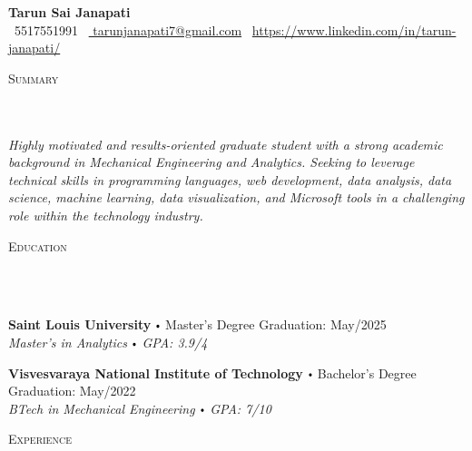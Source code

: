 \documentclass{article}
\newcommand{\school}[4]{
        \textbf{#1} \labelitemi #2 \hfill #3 \\ #4 \vspace*{5pt}
      }
\newcommand{\lineunder}{
        \vspace*{-8pt} \\ \hspace*{-18pt} 
        \hrulefill \\
        }
\newcommand{\header}[1]{{
        \hspace*{-15pt}\vspace*{6pt} \textsc{#1}} \vspace*{-6pt} 
        \lineunder
        }
\renewcommand{\labelitemi}{
        $\vcenter{\hbox{\tiny$\bullet$}}$\hspace*{3pt}
        }
\begin{document}
  
      \small
      \smallskip
      \vspace*{-44pt}
  
      \begin{center}
        {\LARGE \textbf{Tarun Sai Janapati}} \\
        \faPhone\ 5517551991 \quad
        \faEnvelope\ \href{mailto:  tarunjanapati7@gmail.com}{  tarunjanapati7@gmail.com} \quad
        \faLinkedin\ \url{https://www.linkedin.com/in/tarun-janapati/}
      \end{center}
     \vspace*{4pt}%
      \header{Summary}
  
      {
        \textit{Highly motivated and results-oriented graduate student with a strong academic background in Mechanical Engineering and Analytics. Seeking to leverage technical skills in programming languages, web development, data analysis, data science, machine learning, data visualization, and Microsoft tools in a challenging role within the technology industry.}
        }
  
      \vspace*{4pt}%
  
     \header{Education}
  
      {
        \school{Saint Louis University}{Master's Degree}{Graduation: May/2025}{\textit{Master's in Analytics \labelitemi GPA: 3.9/4}}
        

        \school{Visvesvaraya National Institute of Technology}{Bachelor's Degree}{Graduation: May/2022}{\textit{BTech in Mechanical Engineering \labelitemi GPA: 7/10}}
        }
  
      \vspace*{4pt}%
      \header{Experience}
  
\end{document}
